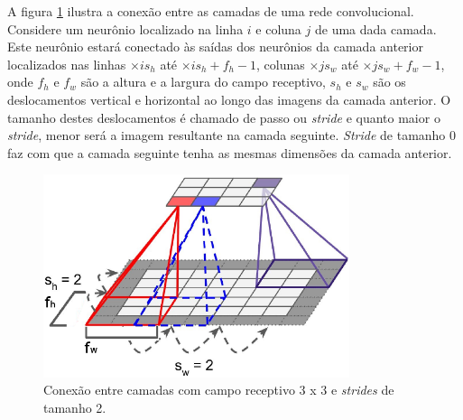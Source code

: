 A figura \ref{fig:cnn_stride} ilustra a conexão entre as camadas de uma rede convolucional.
Considere um neurônio localizado na linha $i$ e coluna $j$ de uma dada camada.
Este neurônio estará conectado às saídas dos neurônios da camada anterior
localizados nas linhas $\times{i}{s_h}$ até $\times{i}{s_h}+f_h - 1$, colunas
$\times{j}{s_w}$ até $\times{j}{s_w}+f_w - 1$, onde
$f_h$ e $f_w$ são a altura e a largura do campo receptivo, $s_h$ e $s_w$
são os deslocamentos vertical e horizontal ao longo das imagens da camada anterior.
O tamanho destes deslocamentos é chamado de passo ou \textit{stride}
e quanto maior o \textit{stride}, menor será a imagem resultante na camada seguinte. \textit{Stride} de tamanho
$0$ faz com que a camada seguinte tenha as mesmas dimensões da camada anterior.
\begin{figure}[htp]
\begin{center}
  \includegraphics[width=0.8\textwidth]{fig/cnn_layer_stride_2}
  \caption{Conexão entre camadas com campo receptivo 3 x 3 e \textit{strides} de tamanho 2.}
  \label{fig:cnn_stride}
\end{center}
\end{figure}

